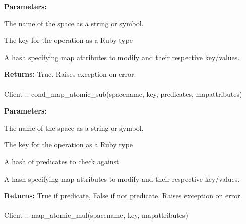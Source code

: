 \noindent\textbf{Parameters:}
\begin{description}[labelindent=\widthof{{\code{mapattributes}}},leftmargin=*,noitemsep,nolistsep,align=right]
\item[\code{spacename}] The name of the space as a string or symbol.
\item[\code{key}] The key for the operation as a Ruby type
\item[\code{mapattributes}] A hash specifying map attributes to modify and their respective key/values.
\end{description}

\noindent\textbf{Returns:}
True.  Raises exception on error.

\paragraph{}
\label{api:ruby:cond_map_atomic_sub}
\begin{ccode}
Client :: cond_map_atomic_sub(spacename, key, predicates, mapattributes)
\end{ccode}
\funcdesc 

\noindent\textbf{Parameters:}
\begin{description}[labelindent=\widthof{{\code{mapattributes}}},leftmargin=*,noitemsep,nolistsep,align=right]
\item[\code{spacename}] The name of the space as a string or symbol.
\item[\code{key}] The key for the operation as a Ruby type
\item[\code{predicates}] A hash of predicates to check against.
\item[\code{mapattributes}] A hash specifying map attributes to modify and their respective key/values.
\end{description}

\noindent\textbf{Returns:}
True if predicate, False if not predicate.  Raises exception on error.

\paragraph{}
\label{api:ruby:map_atomic_mul}
\begin{ccode}
Client :: map_atomic_mul(spacename, key, mapattributes)
\end{ccode}
\funcdesc 

